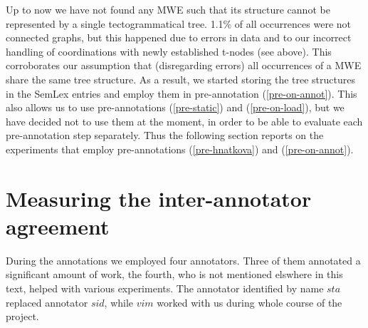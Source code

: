 

Up to now we have not found any MWE such that its structure cannot be represented by a single tectogrammatical tree. 1.1\% of all occurrences were not connected graphs, but this happened due to errors in data and to our incorrect handling of coordinations with newly established t-nodes (see above). This corroborates our assumption that (disregarding errors) all occurrences of a MWE share the same tree structure. As a result, we started storing the tree structures in the SemLex entries and employ them in pre-annotation (\ref{pre-on-annot}). This also allows us to use pre-annotations (\ref{pre-static}) and (\ref{pre-on-load}), but we have decided not to use them at the moment, in order to be able to evaluate each pre-annotation step separately. Thus the following section reports on the experiments that employ pre-annotations (\ref{pre-hnatkova}) and (\ref{pre-on-annot}).





\section{Measuring the inter-annotator agreement}
\label{sec:annot:analysis}
During the annotations we employed four annotators. Three of them annotated a significant amount of work, the fourth, who is not mentioned elswhere in this text, helped with various experiments. The annotator identified by name $sta$ replaced annotator $sid$, while $vim$ worked with us during whole course of the project. 

